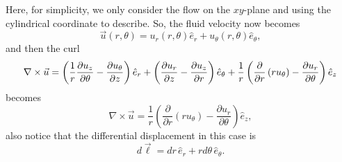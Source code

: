 \documentclass[11pt,]{beamer}
\begin{document}
\begin{frame}
	Here, for simplicity, we only consider the flow on the $xy$-plane and 
	using the cylindrical coordinate to describe. So, the fluid velocity now becomes
	\begin{equation}
	\vec{u}(r,\theta) = u_r(r,\theta) \hat{e}_r + u_\theta (r,\theta) \hat{e}_\theta,
	\end{equation}
	and then the curl
	\begin{equation}\small
		\nabla \times \vec{u} =
		\left(\frac {1}{r}\frac{\partial u_z}{\partial \theta}
			-\frac{\partial u_\theta}{\partial z}\right) \hat{e}_r
		+\left(\frac {\partial u_r}{\partial z}
			-\frac {\partial u_z}{\partial r}\right) \hat{e}_\theta
		+\frac{1}{r}\left(\frac {\partial}{\partial r}\left(r u_\theta\right)
			-\frac{\partial u_r}{\partial \theta}\right)\hat{e}_z
	\end{equation}
	becomes
	\begin{equation}
	\nabla \times \vec{u} = \frac{1}{r}\left(\frac {\partial}{\partial r}\left(r u_\theta\right)
		-\frac{\partial u_r}{\partial \theta}\right)\hat{e}_z,
	\end{equation}
	also notice that the differential displacement in this case is 
	\begin{equation}
	d\vec{\ell} = dr\,\hat{e}_{r} + rd\theta\,\hat{e}_{\theta}.
	\end{equation}

\end{frame}
\end{document}
